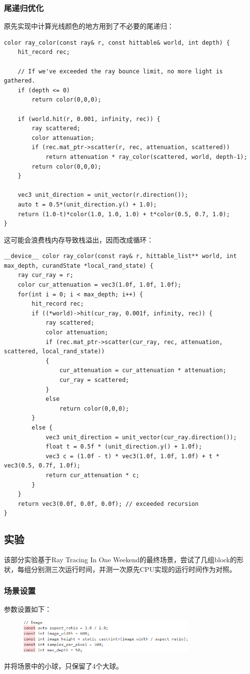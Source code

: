 \documentclass[UTF8, a4paper, 11pt]{article}
\begin{document}
\subsubsection{尾递归优化}
原先实现中计算光线颜色的地方用到了不必要的尾递归：
\begin{lstlisting}
color ray_color(const ray& r, const hittable& world, int depth) {
    hit_record rec;

    // If we've exceeded the ray bounce limit, no more light is gathered.
    if (depth <= 0)
        return color(0,0,0);

    if (world.hit(r, 0.001, infinity, rec)) {
        ray scattered;
        color attenuation;
        if (rec.mat_ptr->scatter(r, rec, attenuation, scattered))
            return attenuation * ray_color(scattered, world, depth-1);
        return color(0,0,0);
    }

    vec3 unit_direction = unit_vector(r.direction());
    auto t = 0.5*(unit_direction.y() + 1.0);
    return (1.0-t)*color(1.0, 1.0, 1.0) + t*color(0.5, 0.7, 1.0);
}
\end{lstlisting}
这可能会浪费栈内存导致栈溢出，因而改成循环：
\begin{lstlisting}
__device__ color ray_color(const ray& r, hittable_list** world, int max_depth, curandState *local_rand_state) {
    ray cur_ray = r;
	color cur_attenuation = vec3(1.0f, 1.0f, 1.0f);
    for(int i = 0; i < max_depth; i++) {
        hit_record rec;
        if ((*world)->hit(cur_ray, 0.001f, infinity, rec)) {
			ray scattered;
			color attenuation;
			if (rec.mat_ptr->scatter(cur_ray, rec, attenuation, scattered, local_rand_state))
			{
				cur_attenuation = cur_attenuation * attenuation;
				cur_ray = scattered;
			}
			else
				return color(0,0,0);
        }
        else {
            vec3 unit_direction = unit_vector(cur_ray.direction());
			float t = 0.5f * (unit_direction.y() + 1.0f);
			vec3 c = (1.0f - t) * vec3(1.0f, 1.0f, 1.0f) + t * vec3(0.5, 0.7f, 1.0f);
            return cur_attenuation * c;
        }
    }
	return vec3(0.0f, 0.0f, 0.0f); // exceeded recursion
}
\end{lstlisting}
\subsection{实验}
该部分实验基于Ray Tracing In One Weekend的最终场景，尝试了几组block的形状，每组分别测三次运行时间，并测一次原先CPU实现的运行时间作为对照。
\subsubsection{场景设置}
参数设置如下：
\begin{figure}[H]
    \centering
    \includegraphics[width=0.8\textwidth]{hyper.png}
\end{figure}
并将场景中的小球，只保留了4个大球。
\end{document}
